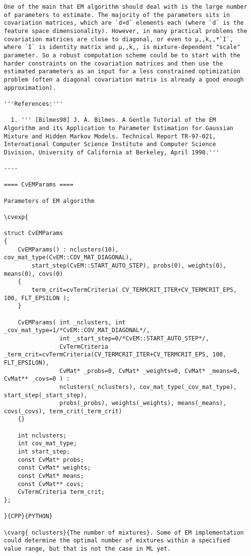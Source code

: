 \begin{verbatim}
One of the main that EM algorithm should deal with is the large number of parameters to estimate. The majority of the parameters sits in covariation matrices, which are `d×d` elements each (where `d` is the feature space dimensionality). However, in many practical problems the covariation matrices are close to diagonal, or even to μ,,k,,*`I`, where `I` is identity matrix and μ,,k,, is mixture-dependent "scale" parameter. So a robust computation scheme could be to start with the harder constraints on the covariation matrices and then use the estimated parameters as an input for a less constrained optimization problem (often a diagonal covariation matrix is already a good enough approximation).

'''References:'''

  1. ''' [Bilmes98] J. A. Bilmes. A Gentle Tutorial of the EM Algorithm and its Application to Parameter Estimation for Gaussian Mixture and Hidden Markov Models. Technical Report TR-97-021, International Computer Science Institute and Computer Science Division, University of California at Berkeley, April 1998.'''

----

==== CvEMParams ====

Parameters of EM algorithm

\cvexp{

struct CvEMParams
{
    CvEMParams() : nclusters(10), cov_mat_type(CvEM::COV_MAT_DIAGONAL),
        start_step(CvEM::START_AUTO_STEP), probs(0), weights(0), means(0), covs(0)
    {
        term_crit=cvTermCriteria( CV_TERMCRIT_ITER+CV_TERMCRIT_EPS, 100, FLT_EPSILON );
    }

    CvEMParams( int _nclusters, int _cov_mat_type=1/*CvEM::COV_MAT_DIAGONAL*/,
                int _start_step=0/*CvEM::START_AUTO_STEP*/,
                CvTermCriteria _term_crit=cvTermCriteria(CV_TERMCRIT_ITER+CV_TERMCRIT_EPS, 100, FLT_EPSILON),
                CvMat* _probs=0, CvMat* _weights=0, CvMat* _means=0, CvMat** _covs=0 ) :
                nclusters(_nclusters), cov_mat_type(_cov_mat_type), start_step(_start_step),
                probs(_probs), weights(_weights), means(_means), covs(_covs), term_crit(_term_crit)
    {}

    int nclusters;
    int cov_mat_type;
    int start_step;
    const CvMat* probs;
    const CvMat* weights;
    const CvMat* means;
    const CvMat** covs;
    CvTermCriteria term_crit;
};

}{CPP}{PYTHON}

\cvarg{ nclusters}{The number of mixtures}. Some of EM implementation could determine the optimal number of mixtures within a specified value range, but that is not the case in ML yet.


\end{verbatim}
